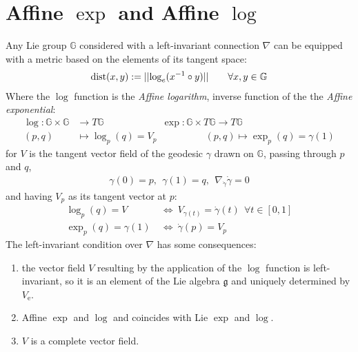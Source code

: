 \section{Affine $\exp$ and Affine $\log$}
Any Lie group $\mathbb{G}$ considered with a left-invariant connection $\nabla$ can be equipped with a metric based on the elements of its tangent space:
\begin{align*} 
	\text{dist}(x,y) := \vert\lvert \log_{e}(x^{-1}\circ y)  \rvert\vert \qquad \forall x, y \in \mathbb{G}
\end{align*}
Where the $\log$ function is the \emph{Affine logarithm}, inverse function of the the \emph{Affine exponential}:
\begin{align*}
	\log : \mathbb{G} \times  \mathbb{G}  & \longrightarrow T \mathbb{G}  
	\qquad \qquad \quad \quad 
	\exp : \mathbb{G} \times T \mathbb{G}     \longrightarrow T \mathbb{G}  
	\\
	(p,q) &\longmapsto \log _{p}(q)  =  V_{p}  
	\qquad \qquad \quad   
	(p,q) \longmapsto \exp _{p}(q)  =  \gamma(1)
\end{align*}
for $V$ is the tangent vector field of the geodesic $\gamma$ drawn on $\mathbb{G}$, passing through $p$ and $q$, 
\begin{align*}
	\gamma(0) = p, ~~ \gamma(1)=q, ~~\nabla_{\dot{\gamma}}\dot{\gamma} = 0
\end{align*}
and having $V_{p}$ as its tangent vector at $p$:
\begin{align*}
	\log _{p}(q)   = V ~&\Leftrightarrow ~ V_{\gamma(t)} = \dot{\gamma}(t) ~~ \forall t \in [0,1]\\
	\exp _{p}(q)  =  \gamma(1) ~&\Leftrightarrow ~ \dot{\gamma}(p) = V_{p}
\end{align*}
The left-invariant condition over $\nabla$ has some consequences: 
\begin{enumerate}
	\item the vector field $V$ resulting by the application of the $\log$ function is left-invariant, so it is an element of the Lie algebra $\mathfrak{g}$ and uniquely determined by $V_{\text{e}}$. 
	\item Affine $\exp$ and $\log$ and coincides with Lie $\exp$ and $\log$.
	\item $V$ is a complete vector field.
\end{enumerate}	


